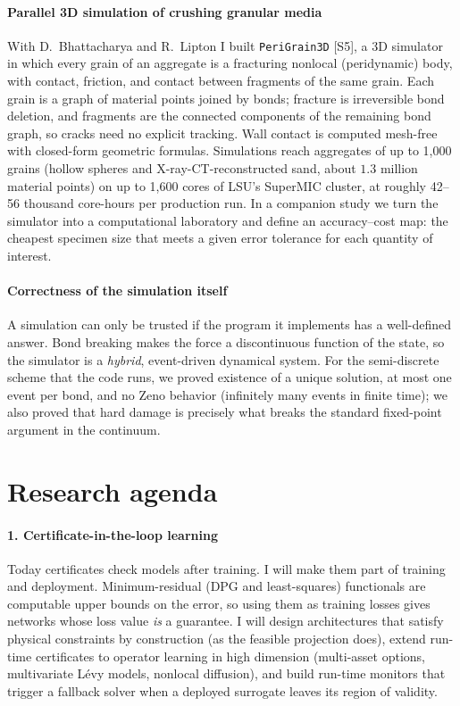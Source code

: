 \documentclass[11pt]{article}
\newcommand{\rc}[1]{\textcolor{accent}{[#1]}}
\begin{document}
\paragraph{Parallel 3D simulation of crushing granular media}
With D.~Bhattacharya and R.~Lipton I built \texttt{PeriGrain3D} \rc{S5}, a 3D
simulator in which every grain of an aggregate is a fracturing nonlocal
(peridynamic) body, with contact, friction, and contact between fragments of
the same grain. Each grain is a graph of material points joined by bonds;
fracture is irreversible bond deletion, and fragments are the connected
components of the remaining bond graph, so cracks need no explicit tracking.
Wall contact is computed mesh-free with closed-form geometric formulas.
Simulations reach aggregates of up to 1{,}000 grains (hollow spheres and
X-ray-CT-reconstructed sand, about $1.3$ million material points) on up to
1{,}600 cores of LSU's SuperMIC cluster, at roughly 42--56 thousand core-hours
per production run. %
In a companion study we turn the simulator into a computational laboratory and
define an accuracy--cost map: the cheapest specimen size that meets a given
error tolerance for each quantity of interest. %

\paragraph{Correctness of the simulation itself}
A simulation can only be trusted if the program it implements has a
well-defined answer. Bond breaking makes the force a discontinuous function of
the state, so the simulator is a \emph{hybrid}, event-driven dynamical system.
For the semi-discrete scheme that the code runs, we proved existence of a
unique solution, at most one event per bond, and no Zeno behavior (infinitely
many events in finite time); we also proved that hard damage is precisely
what breaks the standard fixed-point argument in the continuum.

\section{Research agenda}

\paragraph{1. Certificate-in-the-loop learning}
Today certificates check models after training. I will make them part of
training and deployment. Minimum-residual (DPG and least-squares) functionals
are computable upper bounds on the error, so using them as training losses
gives networks whose loss value \emph{is} a guarantee. I will design
architectures that satisfy physical constraints by construction (as the
feasible projection does), extend run-time certificates to operator learning
in high dimension (multi-asset options, multivariate L\'evy models,
nonlocal diffusion), and build run-time monitors that trigger a fallback
solver when a deployed surrogate leaves its region of validity.
\end{document}
